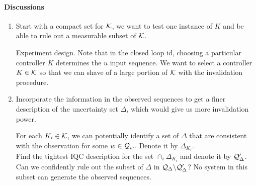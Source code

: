 \documentclass[11pt, onecolumn]{article}
\begin{document}
\paragraph{Discussions}
\begin{enumerate}
\item Start with a compact set for $\mathcal K$, we want to test one instance of $K$ and be able to rule
  out a measurable subset of $\mathcal K$.

  Experiment design. Note that in the closed loop id, choosing a particular controller $K$
  determines the $u$ input sequence. We want to select a controller $K\in \mathcal K$ so that we can
  shave of a large portion of $\mathcal K$ with the invalidation procedure.

\item Incorporate the information in the observed sequences to get a finer description of the
  uncertainty set $\Delta$, which would give us more invalidation power.

 For each $K_i\in\mathcal K$, we can potentially identify a set of $\Delta$ that are consistent with
  the observation for some $w\in\mathcal Q_{w}$. Denote it by $\Delta_{K_i}$.
  \\
  Find the tightest IQC description for the set $\cap_i \Delta_{K_i}$ and denote it by $\mathcal
  Q_{\Delta}'$.  Can we confidently rule out the subset of $\Delta$ in $\mathcal Q_{\Delta} \backslash
  \mathcal Q_{\Delta}'$?  No system in this subset can generate the observed sequences.


\end{enumerate}








\end{document}
